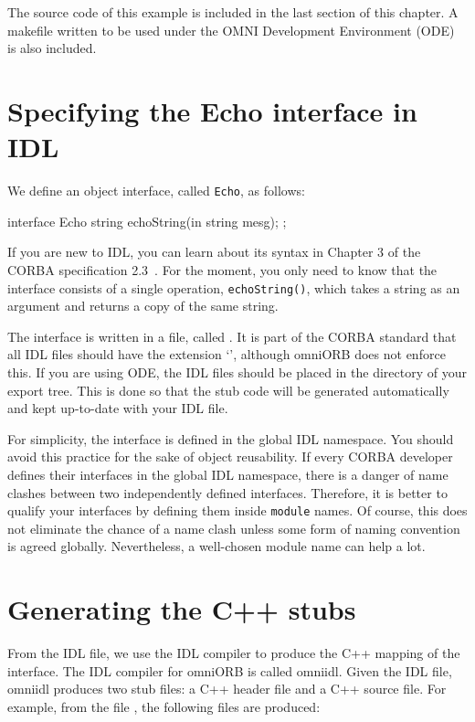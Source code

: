 \documentclass[11pt,twoside,a4paper]{book}
\newcommand{\intf}[1]{\texttt{#1}}
\newcommand{\code}[1]{\texttt{#1}}
\newcommand{\op}[1]{\texttt{#1()}}
\newcommand{\file}{\begingroup \urlstyle{tt}\Url}
\begin{document}
The source code of this example is included in the last section of
this chapter. A makefile written to be used under the OMNI Development
Environment (ODE)~\cite{tjr96b} is also included.


\section{Specifying the Echo interface in IDL}

We define an object interface, called \intf{Echo}, as follows:

\begin{idllisting}
interface Echo {
    string echoString(in string mesg);
};
\end{idllisting}


If you are new to IDL, you can learn about its syntax in Chapter 3 of
the CORBA specification 2.3~\cite{corba23-spec}. For the moment, you
only need to know that the interface consists of a single operation,
\op{echoString}, which takes a string as an argument and returns a
copy of the same string.

The interface is written in a file, called \file{echo.idl}. It is part
of the CORBA standard that all IDL files should have the extension
`\file{.idl}', although omniORB does not enforce this. If you are
using ODE, the IDL files should be placed in the \file{idl} directory
of your export tree. This is done so that the stub code will be
generated automatically and kept up-to-date with your IDL file.

For simplicity, the interface is defined in the global IDL namespace.
You should avoid this practice for the sake of object reusability.  If
every CORBA developer defines their interfaces in the global IDL
namespace, there is a danger of name clashes between two independently
defined interfaces. Therefore, it is better to qualify your interfaces
by defining them inside \code{module} names. Of course, this does not
eliminate the chance of a name clash unless some form of naming
convention is agreed globally. Nevertheless, a well-chosen module name
can help a lot.

\section{Generating the C++ stubs}

From the IDL file, we use the IDL compiler to produce the C++ mapping
of the interface. The IDL compiler for omniORB is called omniidl.
Given the IDL file, omniidl produces two stub files: a C++ header file
and a C++ source file. For example, from the file \file{echo.idl}, the
following files are produced:
\end{document}
